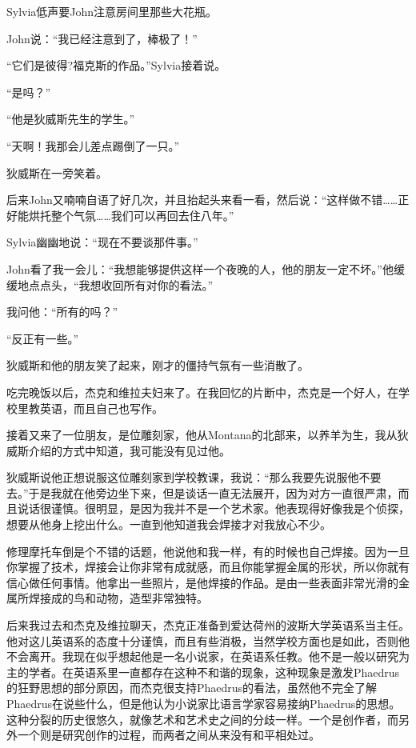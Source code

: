 \documentclass[UTF8]{article}
\begin{document}
\par Sylvia低声要John注意房间里那些大花瓶。
\par John说：“我已经注意到了，棒极了！”
\par “它们是彼得?福克斯的作品。”Sylvia接着说。
\par “是吗？”
\par “他是狄威斯先生的学生。”
\par “天啊！我那会儿差点踢倒了一只。”
\par 狄威斯在一旁笑着。
\par 后来John又喃喃自语了好几次，并且抬起头来看一看，然后说：“这样做不错……正好能烘托整个气氛……我们可以再回去住八年。”
\par Sylvia幽幽地说：“现在不要谈那件事。”
\par John看了我一会儿：“我想能够提供这样一个夜晚的人，他的朋友一定不坏。”他缓缓地点点头，“我想收回所有对你的看法。”
\par 我问他：“所有的吗？”
\par “反正有一些。”
\par 狄威斯和他的朋友笑了起来，刚才的僵持气氛有一些消散了。
\par 吃完晚饭以后，杰克和维拉夫妇来了。在我回忆的片断中，杰克是一个好人，在学校里教英语，而且自己也写作。
\par 接着又来了一位朋友，是位雕刻家，他从Montana的北部来，以养羊为生，我从狄威斯介绍的方式中知道，我可能没有见过他。
\par 狄威斯说他正想说服这位雕刻家到学校教课，我说：“那么我要先说服他不要去。”于是我就在他旁边坐下来，但是谈话一直无法展开，因为对方一直很严肃，而且说话很谨慎。很明显，是因为我并不是一个艺术家。他表现得好像我是个侦探，想要从他身上挖出什么。一直到他知道我会焊接才对我放心不少。
\par 修理摩托车倒是个不错的话题，他说他和我一样，有的时候也自己焊接。因为一旦你掌握了技术，焊接会让你非常有成就感，而且你能掌握金属的形状，所以你就有信心做任何事情。他拿出一些照片，是他焊接的作品。是由一些表面非常光滑的金属所焊接成的鸟和动物，造型非常独特。
\par 后来我过去和杰克及维拉聊天，杰克正准备到爱达荷州的波斯大学英语系当主任。他对这儿英语系的态度十分谨慎，而且有些消极，当然学校方面也是如此，否则他不会离开。我现在似乎想起他是一名小说家，在英语系任教。他不是一般以研究为主的学者。在英语系里一直都存在这种不和谐的现象，这种现象是激发Phaedrus的狂野思想的部分原因，而杰克很支持Phaedrus的看法，虽然他不完全了解Phaedrus在说些什么，但是他认为小说家比语言学家容易接纳Phaedrus的思想。这种分裂的历史很悠久，就像艺术和艺术史之间的分歧一样。一个是创作者，而另外一个则是研究创作的过程，而两者之间从来没有和平相处过。
\end{document}
